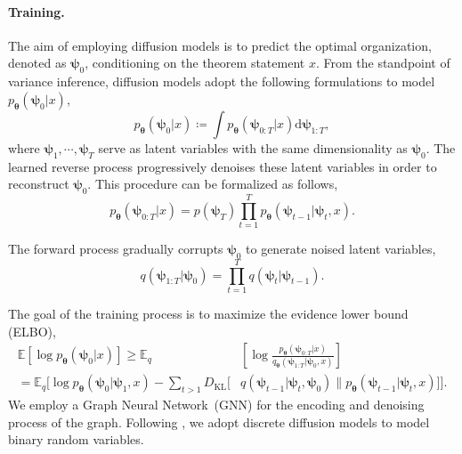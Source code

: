 \documentclass{article}
\begin{document}
\paragraph{Training.}
The aim of employing diffusion models is to predict the optimal organization, denoted as $\boldsymbol{\psi}_0$, conditioning on the theorem statement $x$.
From the standpoint of variance inference, diffusion models adopt the following formulations to model $p_{\boldsymbol{\theta}}(\boldsymbol{\psi}_0|x)$,
\begin{equation}
    p_{\boldsymbol{\theta}}(\boldsymbol{\psi}_0|x) \coloneqq \int p_{\boldsymbol{\theta}}(\boldsymbol{\psi}_{0:T}|x) \mathrm{d}\boldsymbol{\psi}_{1:T},
\end{equation}
where $\boldsymbol{\psi}_1, \cdots, \boldsymbol{\psi}_T$ serve as latent variables with the same dimensionality as $\boldsymbol{\psi}_0$.
The learned reverse process progressively denoises these latent variables in order to reconstruct $\boldsymbol{\psi}_0$. This procedure can be formalized as follows,
\begin{equation}
    p_{\boldsymbol{\theta}}(\boldsymbol{\psi}_{0:T}|x)=p(\boldsymbol{\psi}_T)\prod_{t=1}^{T}p_{\boldsymbol{\theta}}(\boldsymbol{\psi}_{t-1}|\boldsymbol{\psi}_t,x).
\end{equation}

The forward process gradually corrupts $\boldsymbol{\psi}_0$ to generate noised latent variables,
\begin{equation}
q(\boldsymbol{\psi}_{1:T}|\boldsymbol{\psi}_0)=\prod_{t=1}^{T}q(\boldsymbol{\psi}_t|\boldsymbol{\psi}_{t-1}).
\end{equation}

The goal of the training process is to maximize the evidence lower bound (ELBO),
\begin{equation}
\begin{aligned}
     \mathbb{E}\left[ \log p_{\boldsymbol{\theta}}(\boldsymbol{\psi}_0|x)\right] \ge 
    \mathbb{E}_q& \left[\log \frac{p_{\boldsymbol{\theta}}(\boldsymbol{\psi}_{0:T}|x)}{q_{\boldsymbol{\theta}}(\boldsymbol{\psi}_{1:T} | \boldsymbol{\psi}_0,x)}\right] \\
    = \mathbb{E}_q  \biggl[\log p_{\boldsymbol{\theta}} (\boldsymbol{\psi}_0 | \boldsymbol{\psi}_1,x) - 
        \sum_{t>1} D_{\mathrm{KL}}[ & q(\boldsymbol{\psi}_{t-1}|\boldsymbol{\psi}_t, \boldsymbol{\psi}_0) \| p_{\boldsymbol{\theta}}(\boldsymbol{\psi}_{t-1}|\boldsymbol{\psi}_t,x)]
    \biggr].
\end{aligned}
\end{equation}
We employ a Graph Neural Network~(GNN) for the encoding and denoising process of the graph. Following \citet{austin2021structured}, we adopt discrete diffusion models to model binary random variables. 
\end{document}
